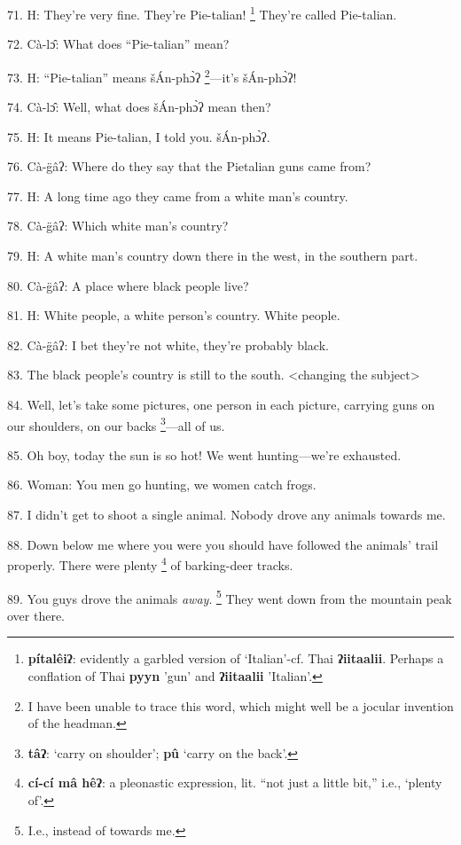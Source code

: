 71. H: They're very fine. They're Pie-talian! \footnote{\textbf{pítalêiʔ}: evidently a garbled version of `Italian'-cf. Thai \textbf{ʔiitaalii}. Perhaps a conflation of Thai \textbf{pyyn} 'gun' and \textbf{ʔiitaalii} 'Italian'.} They're called Pie-talian.

72. Cà-lɔ̂: What does ``Pie-talian'' mean?

73. H: ``Pie-talian'' means šÁn-phɔ̀ʔ \footnote{I have been unable to trace this word, which might well be a jocular invention of the headman.}---it's šÁn-phɔ̀ʔ!

74. Cà-lɔ̂: Well, what does šÁn-phɔ̀ʔ mean then?

75. H: It means Pie-talian, I told you. šÁn-phɔ̀ʔ.

76. Cà-g̈âʔ: Where do they say that the Pietalian guns came from?

77. H: A long time ago they came from a white man's country.

78. Cà-g̈âʔ: Which white man's country?

79. H: A white man's country down there in the west, in the southern part.

80. Cà-g̈âʔ: A place where black people live?

81. H: White people, a white person's country. White people.

82. Cà-g̈âʔ: I bet they're not white, they're probably black.

83. The black people's country is still to the south. <changing the subject>

84. Well, let's take some pictures, one person in each picture, carrying guns on
our shoulders, on our backs \footnote{\textbf{tâʔ}: `carry on shoulder'; \textbf{pû }`carry on the back'.}---all of us.

85. Oh boy, today the sun is so hot! We went hunting---we're exhausted.

86. Woman: You men go hunting, we women catch frogs.

87. I didn't get to shoot a single animal. Nobody drove any animals towards me.

88. Down below me where you were you should have followed the animals' trail properly.
There were plenty \footnote{\textbf{cí-cí mâ hêʔ}: a pleonastic expression, lit. ``not just a little bit,'' i.e., `plenty of'.} of barking-deer tracks.

89. You guys drove the animals \textit{away}. \footnote{I.e., instead of towards me.} They went down from the mountain
peak over there.

